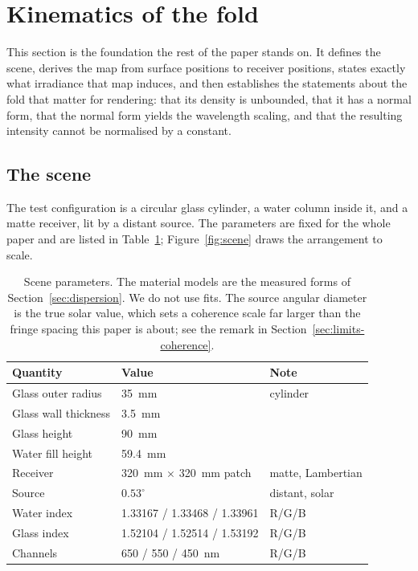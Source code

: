 \section{Kinematics of the fold}
\label{sec:kinematics}

This section is the foundation the rest of the paper stands on. It defines the
scene, derives the map from surface positions to receiver positions, states
exactly what irradiance that map induces, and then establishes the statements
about the fold that matter for rendering: that its density is unbounded, that
it has a normal form, that the normal form yields the wavelength scaling, and
that the resulting intensity cannot be normalised by a constant.

\subsection{The scene}
\label{sec:scene}

The test configuration is a circular glass cylinder, a water column inside it,
and a matte receiver, lit by a distant source. The parameters are fixed for the
whole paper and are listed in Table~\ref{tab:scene}; Figure~\ref{fig:scene}
draws the arrangement to scale.

\begin{table}[tp]
\centering
\caption{Scene parameters. The material models are the measured forms of Section~\ref{sec:dispersion}. We do not use fits. The source angular diameter is the true
solar value, which sets a coherence scale far larger than the fringe spacing
this paper is about; see the remark in Section~\ref{sec:limits-coherence}.}
\label{tab:scene}
\footnotesize
\begin{tabular}{@{}lll@{}}
\toprule
Quantity & Value & Note \\
\midrule
Glass outer radius        & \SI{35}{\milli\meter}       & cylinder \\
Glass wall thickness      & \SI{3.5}{\milli\meter}      & \\
Glass height              & \SI{90}{\milli\meter}       & \\
Water fill height         & \SI{59.4}{\milli\meter}     & \\
Receiver                  & \SI{320}{\milli\meter} $\times$ \SI{320}{\milli\meter} patch & matte, Lambertian \\
Source                    & $0.53^\circ$          & distant, solar \\
Water index               & \num{1.33167} / \num{1.33468} / \num{1.33961} & R/G/B \\
Glass index               & \num{1.52104} / \num{1.52514} / \num{1.53192} & R/G/B \\
Channels                  & \SI{650}{} / \SI{550}{} / \SI{450}{\nano\meter} & R/G/B \\
\bottomrule
\end{tabular}
\end{table}

